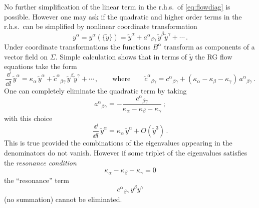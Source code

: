 No further simplification of the linear term in the r.h.s.\ of \eqref{eq:flowdiag}
is possible. However one may ask if the quadratic and higher order terms in the
r.h.s.\ can be simplified by nonlinear coordinate transformation
\[
y^\alpha=y^\alpha(\{\tilde y\})=\tilde y^\alpha+a^\alpha{}_{\beta\gamma}\,\tilde y^\beta\tilde y^\gamma+\cdots\,.
\]
Under coordinate transformations the functions $B^\alpha$ transform as components
of a vector field on $\Sigma$. Simple calculation shows that in terms of $\tilde y$
the RG flow equations take the form
\[
\frac{\dd}{\dd l}\,\tilde y^\alpha=\kappa_\alpha\,\tilde y^\alpha+\tilde c^\alpha{}_{\beta\gamma}\,\tilde y^\beta\tilde y^\gamma+\cdots\,,
\qquad\text{where}\qquad
\tilde c^\alpha{}_{\beta\gamma}=c^\alpha{}_{\beta\gamma}+(\kappa_\alpha-\kappa_\beta-\kappa_\gamma)\,a^\alpha{}_{\beta\gamma}\,.
\]
One can completely eliminate the quadratic term by taking
\[
a^\alpha{}_{\beta\gamma}=-\frac{c^\alpha{}_{\beta\gamma}}{\kappa_\alpha-\kappa_\beta-\kappa_\gamma}\,;
\]
with this choice
\[
\frac{\dd}{\dd l}\,\tilde y^\alpha=\kappa_\alpha\,\tilde y^\alpha+O(\tilde y^3)\,.
\]
This is true provided the combinations of the eigenvalues appearing in the
denominators do not vanish. However if some triplet of the eigenvalues satisfies
the \emph{resonance condition}
\[
\kappa_\alpha-\kappa_\beta-\kappa_\gamma=0
\]
the ``resonance'' term
\[
c^\alpha{}_{\beta\gamma}\,y^\beta y^\gamma
\]
(no summation) cannot be eliminated.

